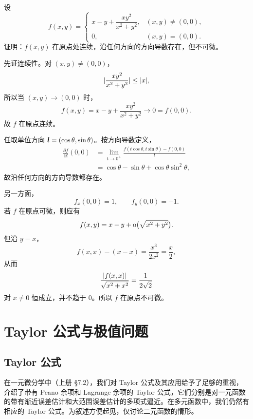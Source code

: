 \begin{xexercise}[6]
设
  \[
    f(x,y)=\begin{cases}
      x-y+\dfrac{xy^2}{x^2+y^2},&(x,y)\ne(0,0),\\[6pt]
      0,&(x,y)=(0,0).
    \end{cases}
  \]
  证明：$f(x,y)$ 在原点处连续，沿任何方向的方向导数存在，但不可微。
\end{xexercise}
\begin{xsolution}
先证连续性。对 $(x,y)\ne(0,0)$，
\[
  \lvert\frac{xy^2}{x^2+y^2}\rvert
  \le \lvert x\rvert,
\]
所以当 $(x,y)\to(0,0)$ 时，
\[
  f(x,y)=x-y+\frac{xy^2}{x^2+y^2}\to0=f(0,0).
\]
故 $f$ 在原点连续。

任取单位方向 $\bm{l}=(\cos\theta,\sin\theta)$。按方向导数定义，
\[
\begin{aligned}
  \frac{\partial f}{\partial l}(0,0)
  &=\lim_{t\to0^+}\frac{f(t\cos\theta,t\sin\theta)-f(0,0)}t\\
  &=\cos\theta-\sin\theta
  +\cos\theta\sin^2\theta,
\end{aligned}
\]
故沿任何方向的方向导数都存在。

另一方面，
\[
  f_x(0,0)=1,
  \qquad
  f_y(0,0)=-1.
\]
若 $f$ 在原点可微，则应有
\[
  f(x,y)=x-y+\mathrm{o}\bigl(\sqrt{x^2+y^2}\bigr).
\]
但沿 $y=x$，
\[
  f(x,x)-(x-x)=\frac{x^3}{2x^2}=\frac x2,
\]
从而
\[
  \frac{\lvert f(x,x)\rvert}{\sqrt{x^2+x^2}}
  =\frac1{2\sqrt2}
\]
对 $x\ne0$ 恒成立，并不趋于 $0$。所以 $f$ 在原点不可微。
\end{xsolution}

\section{Taylor 公式与极值问题}

\subsection{Taylor 公式}

在一元微分学中（上册 §7.2），我们对 Taylor 公式及其应用给予了足够的重视，介绍了带有 Peano 余项和 Lagrange 余项的 Taylor 公式，它们分别是对一元函数的带有渐近误差估计和大范围误差估计的多项式逼近。在多元函数中，我们仍然有相应的 Taylor 公式。为叙述方便起见，仅讨论二元函数的情形。

